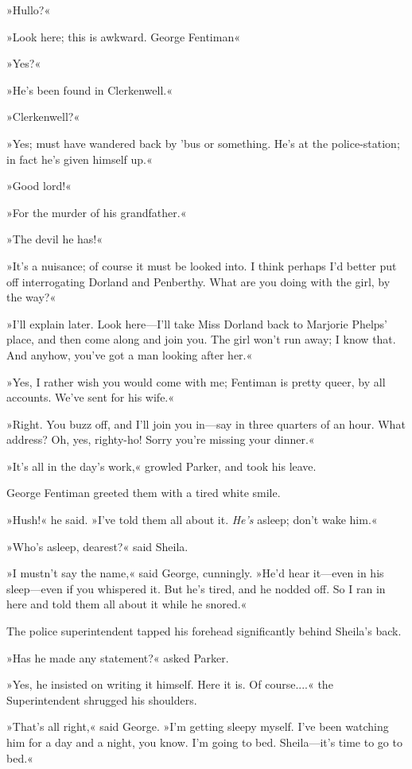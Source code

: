 »Hullo?«

»Look here; this is awkward. George Fentiman\longdash«

»Yes?«

»He's been found in Clerkenwell.«

»Clerkenwell?«

»Yes; must have wandered back by 'bus or something. He's at the police-station; in fact he's given himself up.«

»Good lord!«

»For the murder of his grandfather.«

»The devil he has!«

»It's a nuisance; of course it must be looked into. I think perhaps I'd better put off interrogating Dorland and Penberthy. What are you doing with the girl, by the way?«

»I'll explain later. Look here—I'll take Miss Dorland back to Marjorie Phelps' place, and then come along and join you. The girl won't run away; I know that. And anyhow, you've got a man looking after her.«

»Yes, I rather wish you would come with me; Fentiman is pretty queer, by all accounts. We've sent for his wife.«

»Right. You buzz off, and I'll join you in—say in three quarters of an hour. What address? Oh, yes, righty-ho! Sorry you're missing your dinner.«

»It's all in the day's work,« growled Parker, and took his leave.

George Fentiman greeted them with a tired white smile.

»Hush!« he said. »I've told them all about it. \textit{He's} asleep; don't wake him.«

»Who's asleep, dearest?« said Sheila.

»I mustn't say the name,« said George, cunningly. »He'd hear it—even in his sleep—even if you whispered it. But he's tired, and he nodded off. So I ran in here and told them all about it while he snored.«

The police superintendent tapped his forehead significantly behind Sheila's back.

»Has he made any statement?« asked Parker.

»Yes, he insisted on writing it himself. Here it is. Of course....« the Superintendent shrugged his shoulders.

»That's all right,« said George. »I'm getting sleepy myself. I've been watching him for a day and a night, you know. I'm going to bed. Sheila—it's time to go to bed.«


